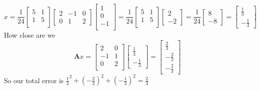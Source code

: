 \documentclass{article}
\begin{document}
$$
x =
\frac{1}{24}
\begin{bmatrix}
5 & 1 \\
1 & 5 \\
\end{bmatrix}
\begin{bmatrix}
2 & -1 & 0 \\
0 &  1 & 2
\end{bmatrix}
\begin{bmatrix}
1  \\
0  \\
-1 \\
\end{bmatrix}
=
\frac{1}{24}
\begin{bmatrix}
5 & 1 \\
1 & 5 \\
\end{bmatrix}
\begin{bmatrix}
2 \\
-2
\end{bmatrix}
=
\frac{1}{24}
\begin{bmatrix}
8 \\
-8
\end{bmatrix}
=
\begin{bmatrix}
\frac{1}{3} \\
-\frac{1}{3}
\end{bmatrix}
$$
How close are we
$$\mathbf{A}x=
\begin{bmatrix}
2 & 0  \\
-1 & 1 \\
0 & 2  \\
\end{bmatrix}
\begin{bmatrix}
\frac{1}{3} \\
-\frac{1}{3}
\end{bmatrix}
=
\begin{bmatrix}
\frac{2}{3} \\
-\frac{2}{3} \\
-\frac{2}{3}
\end{bmatrix}
$$
So our total error is $\frac{1}{3}^2 + (-\frac{2}{3})^2 + (-\frac{1}{3})^2 = \frac{2}{3}$
\end{document}
